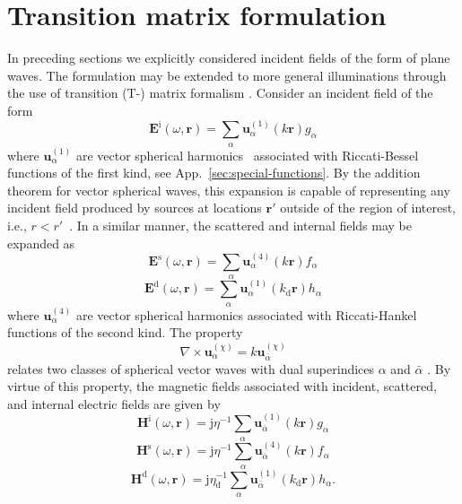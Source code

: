 \documentclass[article]{IEEEtran}
\newcommand{\T}[1]{\mathrm{#1}}
\newcommand{\V}[1]{\boldsymbol{#1}}
\newcommand{\rbkind}{\chi}
\begin{document}
\newcommand{\upia}{\V{u}_\alpha^{(1)}}
\newcommand{\upiab}{\V{u}_{\bar{\alpha}}^{(1)}}
\newcommand{\uppa}{\V{u}_\alpha^{(\rbkind)}}
\newcommand{\uppab}{\V{u}_{\bar{\alpha}}^{(\rbkind)}}
\newcommand{\upoa}{\V{u}_\alpha^{(4)}}
\newcommand{\upoab}{\V{u}_{\bar{\alpha}}^{(4)}}
\newcommand{\Ra}{\T{R}_\alpha}
\newcommand{\Rb}{\T{R}_{\bar{\alpha}}}


\section{Transition matrix formulation}
\label{sec:tmat}


In preceding sections we explicitly considered incident fields of the form of plane waves.  The formulation may be extended to more general illuminations through the use of transition (T-) matrix formalism \cite{waterman1965matrix,chew1990inhomogeneous}.  Consider an incident field of the form
\begin{equation}\label{eq:einc}
    \V{E}^\T{i}(\omega,\V{r}) = \sum_\alpha \upia(k\V{r}) g_\alpha
\end{equation}
where $\upia$ are vector spherical harmonics~\cite{ScatteringofEMWavesbyObstacles} associated with Riccati-Bessel functions of the first kind, see App.~\ref{sec:special-functions}.  By the addition theorem for vector spherical waves, this expansion is capable of representing any incident field produced by sources at locations $\V{r}'$ outside of the region of interest, i.e., $r<r'$~\cite[Eq. 7.5.14]{jin2011theory}. In a similar manner, the scattered and internal fields may be expanded as
\begin{equation}\label{eq:escat}
    \V{E}^\T{s}(\omega,\V{r}) = \sum_\alpha \upoa(k\V{r}) f_\alpha
\end{equation}
\begin{equation}\label{eq:ediel}
    \V{E}^\T{d}(\omega,\V{r}) = \sum_\alpha \upia(k_\T{d}\V{r}) h_\alpha
\end{equation}
where $\upoa$ are vector spherical harmonics associated with Riccati-Hankel functions of the second kind.  The property \cite[Eq. 7.2.4]{chew1990inhomogeneous}
\begin{equation}
    \nabla\times\uppa = k\uppab
\end{equation}
relates two classes of spherical vector waves with dual superindices $\alpha$ and $\bar{\alpha}$ \cite{losenicky2020method}.  By virtue of this property, the magnetic fields associated with incident, scattered, and internal electric fields are given by 
\begin{equation}\label{eq:hinc}
    \V{H}^\T{i}(\omega,\V{r}) = \T{j}\eta^{-1}\sum_\alpha \upiab(k\V{r}) g_\alpha
\end{equation}
\begin{equation}\label{eq:hscat}
    \V{H}^\T{s}(\omega,\V{r}) = \T{j}\eta^{-1}\sum_\alpha \upoab(k\V{r}) f_\alpha
\end{equation}
\begin{equation}\label{eq:hdiel}
    \V{H}^\T{d}(\omega,\V{r}) = \T{j}\eta_\T{d}^{-1}\sum_\alpha \upiab(k_\T{d}\V{r}) h_\alpha.
\end{equation}
\end{document}
